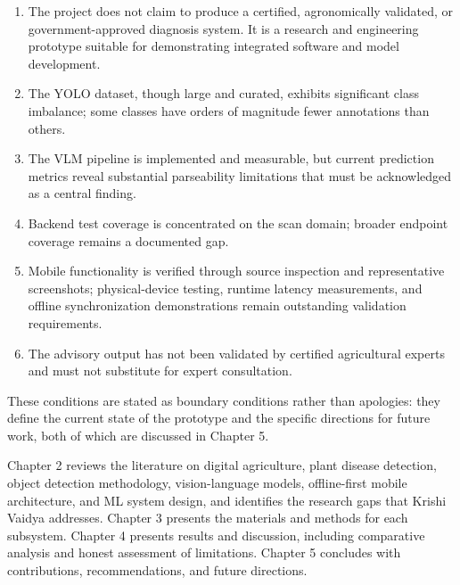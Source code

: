 \begin{enumerate}[label=\arabic*.]
\item The project does not claim to produce a certified, agronomically validated, or
government-approved diagnosis system. It is a research and engineering prototype suitable
for demonstrating integrated software and model development.
\item The YOLO dataset, though large and curated, exhibits significant class imbalance; some
classes have orders of magnitude fewer annotations than others.
\item The VLM pipeline is implemented and measurable, but current prediction metrics reveal
substantial parseability limitations that must be acknowledged as a central finding.
\item Backend test coverage is concentrated on the scan domain; broader endpoint coverage
remains a documented gap.
\item Mobile functionality is verified through source inspection and representative
screenshots; physical-device testing, runtime latency measurements, and offline
synchronization demonstrations remain outstanding validation requirements.
\item The advisory output has not been validated by certified agricultural experts and must
not substitute for expert consultation.
\end{enumerate}

These conditions are stated as boundary conditions rather than apologies: they define the
current state of the prototype and the specific directions for future work, both of which
are discussed in Chapter 5.


Chapter 2 reviews the literature on digital agriculture, plant disease detection, object
detection methodology, vision-language models, offline-first mobile architecture, and ML system
design, and identifies the research gaps that Krishi Vaidya addresses. Chapter 3 presents the
materials and methods for each subsystem. Chapter 4 presents results and discussion, including
comparative analysis and honest assessment of limitations. Chapter 5 concludes with
contributions, recommendations, and future directions.
